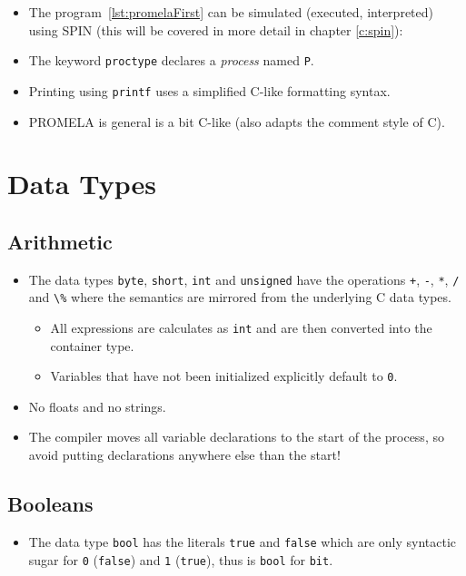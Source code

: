 \documentclass[a4paper, 11pt, accentcolor = tud3b]{tudreport}
\newcommand{\outputlisting}[1]{}
\newcommand{\inlinePromela}[1]{\lstinline[language = PROMELA]|#1|}
\begin{document}
			\begin{itemize}
				\item The program~\ref{lst:promelaFirst} can be simulated (executed, interpreted) using SPIN (this will be covered in more detail in chapter \ref{c:spin}):
					\outputlisting{code/promela/hello-world.pml.out}
				\item The keyword \inlinePromela{proctype} declares a \textit{process} named \texttt{P}.
				\item Printing using \inlinePromela{printf} uses a simplified C-like formatting syntax.
				\item PROMELA is general is a bit C-like (also adapts the comment style of C).
			\end{itemize}

		\section{Data Types}
			\subsection{Arithmetic}
				\begin{itemize}
					\item The data types \inlinePromela{byte}, \inlinePromela{short}, \inlinePromela{int} and \inlinePromela{unsigned} have the operations \inlinePromela{+}, \inlinePromela{-}, \inlinePromela{*}, \inlinePromela{/} and \inlinePromela{\%} where the semantics are mirrored from the underlying C data types.
						\begin{itemize}
							\item All expressions are calculates as \inlinePromela{int} and are then converted into the container type.
							\item Variables that have not been initialized explicitly default to \inlinePromela{0}.
						\end{itemize}
					\item No floats and no strings.
					\item The compiler moves all variable declarations to the start of the process, so avoid putting declarations anywhere else than the start!
				\end{itemize}

			\subsection{Booleans}
				\begin{itemize}
					\item The data type \inlinePromela{bool} has the literals \inlinePromela{true} and \inlinePromela{false} which are only syntactic sugar for \inlinePromela{0} (\inlinePromela{false}) and \inlinePromela{1} (\inlinePromela{true}), thus is \inlinePromela{bool} for \inlinePromela{bit}.
				\end{itemize}
\end{document}
